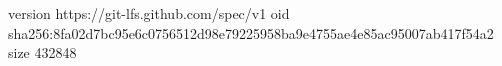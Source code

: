 version https://git-lfs.github.com/spec/v1
oid sha256:8fa02d7bc95e6c0756512d98e79225958ba9e4755ae4e85ac95007ab417f54a2
size 432848
